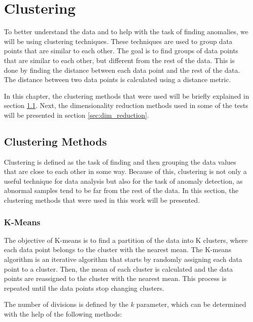 \chapter{Clustering}\label{chap:clustering}

To better understand the data and to help with the task of finding anomalies, we will be using clustering techniques. These techniques are used to group data points that are similar to each other. The goal is to find groups of data points that are similar to each other, but different from the rest of the data. This is done by finding the distance between each data point and the rest of the data. The distance between two data points is calculated using a distance metric.

In this chapter, the clustering methods that were used will be briefly explained in section \ref{sec:clustering_methods}. Next, the dimensionality reduction methods used in some of the tests will be presented in section \ref{sec:dim_reduction}. 

\section{Clustering Methods}\label{sec:clustering_methods}
Clustering is defined as the task of finding and then grouping the data values that are close to each other in some way. Because of this, clustering is not only a useful technique for data analysis but also for the task of anomaly detection, as abnormal samples tend to be far from the rest of the data. In this section, the clustering methods that were used in this work will be presented.

\subsection{K-Means}\label{sec:kmeans} 

The objective of K-means is to find a partition of the data into K clusters, where each data point belongs to the cluster with the nearest mean. The K-means algorithm is an iterative algorithm that starts by randomly assigning each data point to a cluster. Then, the mean of each cluster is calculated and the data points are reassigned to the cluster with the nearest mean. This process is repeated until the data points stop changing clusters. 

The number of divisions is defined by the $k$ parameter, which can be determined with the help of the following methods:

